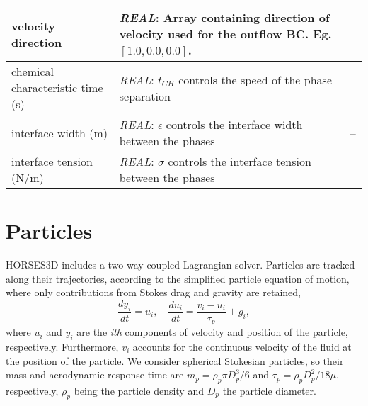 \documentclass[a4paper,10pt]{report}
\begin{document}
\begin{table}[htbp]
\begin{tabular}{|l|p{10cm}|p{2.2cm}|}
    velocity direction                   & \textit{REAL}: Array containing direction of velocity used for the outflow BC. Eg. $[1.0,0.0,0.0]$.                                                              & -- \\ \hline
    chemical characteristic time (s)    & \textit{REAL}: $t_{CH}$ controls the speed of the phase separation    & -- \\ \hline
    interface width (m)                 & \textit{REAL}: $\epsilon$ controls the interface width between the phases   & -- \\ \hline
    interface tension (N/m)             & \textit{REAL}: $\sigma$ controls the interface tension between the phases    & -- \\ \hline
    \end{tabular}
    \label{tab:MUKey}
    \end{table}

\section{Particles}

\vspace{1ex}
\vspace{1ex}

{\selectfont  HORSES3D} includes a two-way coupled Lagrangian solver.
Particles are tracked along their trajectories, according to the simplified particle equation of motion, where only contributions from Stokes drag and gravity are retained,
\begin{equation}
\label{eq:part_motion}
\frac{d y_i}{dt} = u_i, \quad \frac{d u_i}{dt} = \frac{v_i - u_i}{\tau_p} + g_i,
\end{equation}
where $u_i$ and $y_i$ are the \emph{ith} components of velocity and position of the particle, respectively. Furthermore, $v_i$ accounts for the continuous velocity of the fluid at the position of the particle.  We consider spherical Stokesian particles, so their mass and aerodynamic response time are $m_p = \rho_p \pi D_p^3/6$ and $\tau_p = \rho_p D_p^2 / 18\mu $, respectively, $\rho_p$ being the particle density and $D_p$ the particle diameter. 
\end{document}
